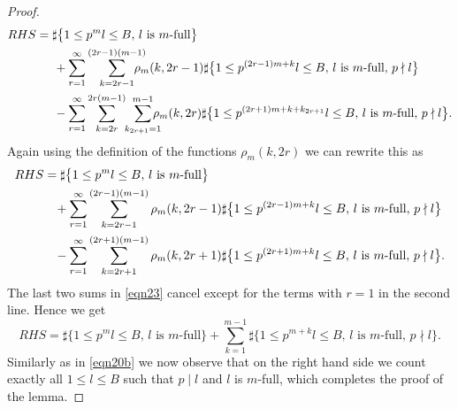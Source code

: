 \documentclass[JEP,XML,SOM,Unicode,published]{cedram}
\theoremstyle{definition}
\numberwithin{theorem}{section}
\begin{document}
\begin{proof}
\begin{equation*}
\begin{split}
RHS = \sharp&\bigl\{1\leq p^ml\leq B,\, l \mbox{ is $m$-full}\bigr\} \\
&\hspace*{-1mm}+ \sum_{r=1}^\infty\sum_{k=2r-1}^{(2r-1)(m-1)}\hspace*{-4mm}\rho_m(k,2r-1)\sharp\bigl\{1\leq p^{(2r-1)m+k}l\leq B,\, l \mbox{ is $m$-full},\, p\nmid l\bigr\}\\
&\hspace*{-1mm}-\sum_{r=1}^\infty\sum_{k=2r}^{2r(m-1)}\hspace*{-1mm}\sum_{k_{2r+1}=1}^{m-1}\hspace*{-3mm}\rho_m(k,2r)\sharp\bigl\{1\leq p^{(2r+1)m+k+k_{2r+1}}l\leq B,\, l \mbox{ is $m$-full},\, p\nmid l\bigr\}.
\end{split}
\end{equation*}
Again using the definition of the functions $\rho_m(k,2r)$ we can rewrite this as
\begin{align}\label{eqn23}
RHS &= \sharp\bigl\{1\leq p^ml\leq B,\, l \mbox{ is $m$-full}\bigr\} \notag\\
&\hspace*{3mm}+ \sum_{r=1}^\infty\sum_{k=2r-1}^{(2r-1)(m-1)}\rho_m(k,2r-1)\sharp\bigl\{1\leq p^{(2r-1)m+k}l\leq B,\, l \mbox{ is $m$-full},\, p\nmid l\bigr\}\\
&\hspace*{3mm}-\sum_{r=1}^\infty\sum_{k=2r+1}^{(2r+1)(m-1)}\rho_m(k,2r+1)\sharp\bigl\{1\leq p^{(2r+1)m+k}l\leq B,\, l \mbox{ is $m$-full},\, p\nmid l\bigr\}.\notag
\end{align}
The last two sums in \eqref{eqn23} cancel except for the terms with $r=1$ in the second line. Hence we get
\begin{equation*}
RHS =\sharp\bigl\{1\leq p^ml\leq B,\, l \mbox{ is $m$-full}\bigr\} + \sum_{k=1}^{m-1}\sharp\bigl\{1\leq p^{m+k}l\leq B,\, l \mbox{ is $m$-full},\, p\nmid l\bigr\}.
\end{equation*}
Similarly as in \eqref{eqn20b} we now observe that on the right hand side we count exactly all $1\leq l\leq B$ such that $p\mid l$ and $l$ is $m$-full, which completes the proof of the lemma.
\end{proof}
\end{document}
